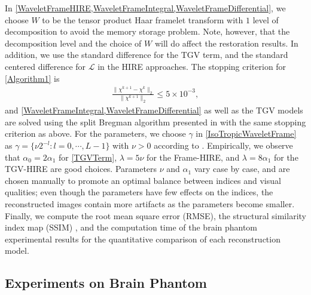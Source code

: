 \documentclass[reqno]{siamonline1116}
\numberwithin{theorem}{section}
\numberwithin{equation}{section}
\def\f{\frac}
\def\msL{{\mathscr L}}
\begin{document}
In \cref{WaveletFrameHIRE,WaveletFrameIntegral,WaveletFrameDifferential}, we choose $W$ to be the tensor product Haar framelet transform with $1$ level of decomposition to avoid the memory storage problem. Note, however, that the decomposition level and the choice of $W$ will do affect the restoration results. In addition, we use the standard difference for the TGV term, and the standard centered difference for $\msL$ in the HIRE approaches. The stopping criterion for \cref{Algorithm1} is
\begin{align*}
\f{\|\chi^{k+1}-\chi^k\|_2}{\|\chi^{k+1}\|_2}\leq5\times10^{-3},
\end{align*}
and \cref{WaveletFrameIntegral,WaveletFrameDifferential} as well as the TGV models are solved using the split Bregman algorithm presented in \cite{J.F.Cai2009/10,W.Guo2014} with the same stopping criterion as above. For the parameters, we choose $\gamma$ in \cref{IsoTropicWaveletFrame} as $\gamma=\big\{\nu2^{-l}:l=0,\cdots,L-1\big\}$ with $\nu>0$ according to \cite{J.F.Cai2012}. Empirically, we observe that $\alpha_0=2\alpha_1$ for \cref{TGVTerm}, $\lambda=5\nu$ for the Frame-HIRE, and $\lambda=8\alpha_1$ for the TGV-HIRE are good choices. Parameters $\nu$ and $\alpha_1$ vary case by case, and are chosen manually to promote an optimal balance between indices and visual qualities; even though the parameters have few effects on the indices, the reconstructed images contain more artifacts as the parameters become smaller. Finally, we compute the root mean square error (RMSE), the structural similarity index map (SSIM) \cite{Z.Wang2004}, and the computation time of the brain phantom experimental results for the quantitative comparison of each reconstruction model.

\subsection{Experiments on Brain Phantom}\label{BrainPhantom}
\end{document}
